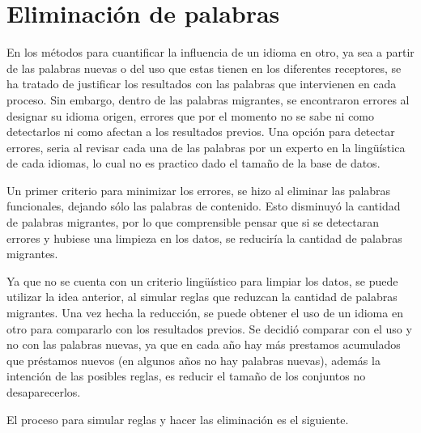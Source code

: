 \chapter{Eliminación de palabras}

En los métodos para cuantificar la influencia de un idioma en otro, ya sea a partir de las palabras nuevas o del uso que estas tienen en los diferentes receptores, se ha tratado de justificar los resultados con las palabras que intervienen en cada proceso. Sin embargo, dentro de las palabras migrantes, se encontraron errores al designar su idioma origen, errores que por el momento no se sabe ni como detectarlos ni como afectan a los resultados previos.  Una opción para detectar errores, seria al revisar cada una de las palabras por un experto en la lingüística de cada idiomas, lo cual no es practico dado el tamaño de la base de datos.

Un primer criterio para minimizar los errores, se hizo al eliminar las palabras funcionales, dejando sólo las palabras de contenido. Esto disminuyó la cantidad de palabras migrantes, por lo que comprensible pensar que si se detectaran errores y hubiese una limpieza en los datos, se reduciría la cantidad de palabras migrantes. 

Ya que no se cuenta con un criterio lingüístico para limpiar los datos, se puede utilizar la idea anterior, al simular  reglas que reduzcan la cantidad de palabras migrantes. Una vez hecha la reducción, se puede obtener el uso de un idioma en otro para compararlo con los resultados previos. Se decidió comparar con el uso y no con las palabras nuevas, ya que en cada año hay más prestamos acumulados que préstamos nuevos (en algunos años no hay palabras nuevas), además la intención de las posibles reglas, es reducir el tamaño de los conjuntos no desaparecerlos.

El proceso para simular reglas y hacer las eliminación es el siguiente. 

